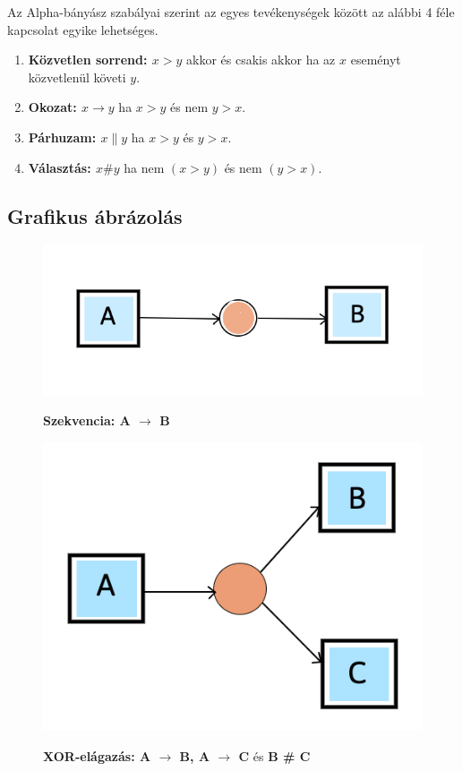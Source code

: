 Az Alpha-bányász szabályai szerint az egyes tevékenységek között az alábbi 4 féle kapcsolat egyike lehetséges.
\begin{enumerate}
\item \textbf{Közvetlen sorrend: $x > y$} akkor és csakis akkor ha az $x$ eseményt közvetlenül követi $y$.
\item \textbf{Okozat: $x \rightarrow y$} ha $x > y$ és nem $y > x$.
\item \textbf{Párhuzam: $x \parallel y$} ha $x > y$ és $y > x$.
\item \textbf{Választás: $x \# y$} ha nem $(x > y)$ és nem $(y > x)$.
\end{enumerate}

\subsection{Grafikus ábrázolás}

\begin{figure}[h!]
\begin{center}
\includegraphics[width=8truecm, height=4truecm]{images/img_alpha_seq}\\
\caption{\textbf{Szekvencia: A $\rightarrow$ B}}
\label{fig:example}
\end{center}
\end{figure}

\begin{figure}[h!]
\begin{center}
\includegraphics[width=8truecm, height=6truecm]{images/img_alpha_xor}\\
\caption{\textbf{XOR-elágazás: A $\rightarrow$ B, A $\rightarrow$ C} és \textbf{B \# C}}
\label{fig:example}
\end{center}
\end{figure}

